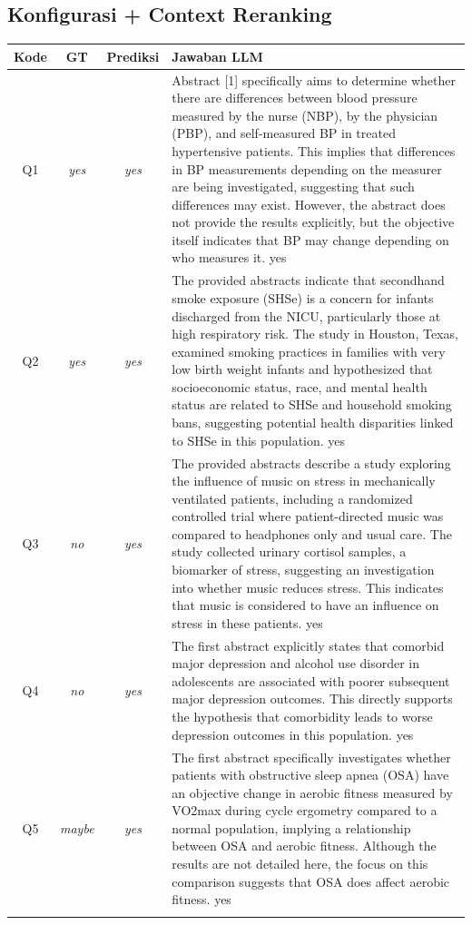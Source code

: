 \subsection*{Konfigurasi + Context Reranking}
\begin{longtable}{@{}c c c >{\raggedright\arraybackslash}p{8.8cm}@{}}
\toprule
\textbf{Kode} & \textbf{GT} & \textbf{Prediksi} & \textbf{Jawaban LLM} \\
\midrule\endhead
Q1 & \textit{yes} & \textit{yes} & Abstract [1] specifically aims to determine whether there are differences between blood pressure measured by the nurse (NBP), by the physician (PBP), and self-measured BP in treated hypertensive patients. This implies that differences in BP measurements depending on the measurer are being investigated, suggesting that such differences may exist. However, the abstract does not provide the results explicitly, but the objective itself indicates that BP may change depending on who measures it. yes \\
\addlinespace
Q2 & \textit{yes} & \textit{yes} & The provided abstracts indicate that secondhand smoke exposure (SHSe) is a concern for infants discharged from the NICU, particularly those at high respiratory risk. The study in Houston, Texas, examined smoking practices in families with very low birth weight infants and hypothesized that socioeconomic status, race, and mental health status are related to SHSe and household smoking bans, suggesting potential health disparities linked to SHSe in this population. yes \\
\addlinespace
Q3 & \textit{no} & \textit{yes} & The provided abstracts describe a study exploring the influence of music on stress in mechanically ventilated patients, including a randomized controlled trial where patient-directed music was compared to headphones only and usual care. The study collected urinary cortisol samples, a biomarker of stress, suggesting an investigation into whether music reduces stress. This indicates that music is considered to have an influence on stress in these patients. yes \\
\addlinespace
Q4 & \textit{no} & \textit{yes} & The first abstract explicitly states that comorbid major depression and alcohol use disorder in adolescents are associated with poorer subsequent major depression outcomes. This directly supports the hypothesis that comorbidity leads to worse depression outcomes in this population. yes \\
\addlinespace
Q5 & \textit{maybe} & \textit{yes} & The first abstract specifically investigates whether patients with obstructive sleep apnea (OSA) have an objective change in aerobic fitness measured by VO2max during cycle ergometry compared to a normal population, implying a relationship between OSA and aerobic fitness. Although the results are not detailed here, the focus on this comparison suggests that OSA does affect aerobic fitness. yes \\
\addlinespace
\bottomrule
\end{longtable}

